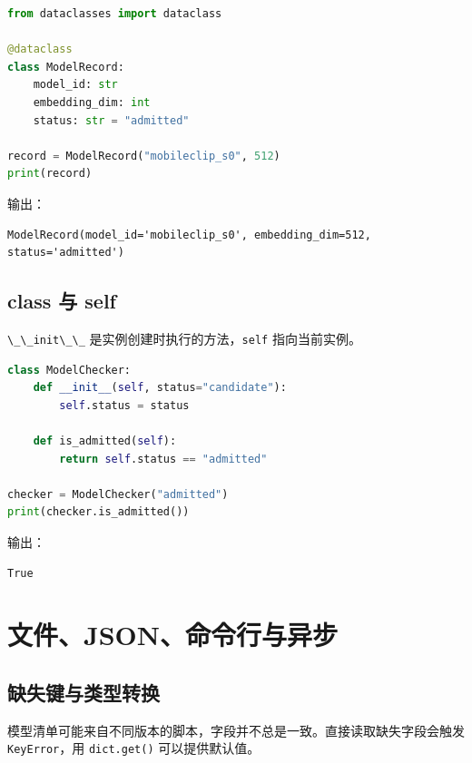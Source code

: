 \begin{lstlisting}[language=Python]
from dataclasses import dataclass

@dataclass
class ModelRecord:
    model_id: str
    embedding_dim: int
    status: str = "admitted"

record = ModelRecord("mobileclip_s0", 512)
print(record)
\end{lstlisting}

输出：

\begin{lstlisting}
ModelRecord(model_id='mobileclip_s0', embedding_dim=512, status='admitted')
\end{lstlisting}

\subsection{class 与 self}\label{class-ux4e0e-self}

\passthrough{\lstinline!\_\_init\_\_!}
是实例创建时执行的方法，\passthrough{\lstinline!self!} 指向当前实例。

\begin{lstlisting}[language=Python]
class ModelChecker:
    def __init__(self, status="candidate"):
        self.status = status

    def is_admitted(self):
        return self.status == "admitted"

checker = ModelChecker("admitted")
print(checker.is_admitted())
\end{lstlisting}

输出：

\begin{lstlisting}
True
\end{lstlisting}

\section{文件、JSON、命令行与异步}\label{ux6587ux4ef6jsonux547dux4ee4ux884cux4e0eux5f02ux6b65}

\subsection{缺失键与类型转换}\label{ux7f3aux5931ux952eux4e0eux7c7bux578bux8f6cux6362}

模型清单可能来自不同版本的脚本，字段并不总是一致。直接读取缺失字段会触发
\passthrough{\lstinline!KeyError!}，用
\passthrough{\lstinline!dict.get()!} 可以提供默认值。

